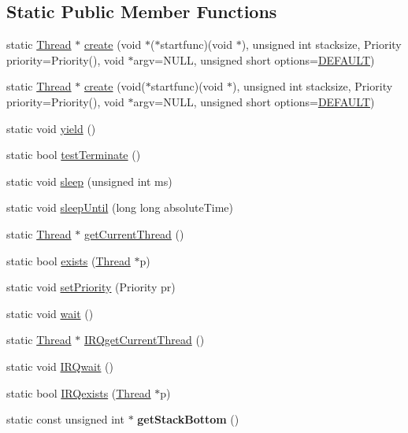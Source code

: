 \subsection*{Static Public Member Functions}
\begin{DoxyCompactItemize}
\item 
static \hyperlink{classmiosix_1_1_thread}{Thread} $\ast$ \hyperlink{classmiosix_1_1_thread_ac5a454f2617a4a28f00842b1097fc363}{create} (void $\ast$($\ast$startfunc)(void $\ast$), unsigned int stacksize, Priority priority=Priority(), void $\ast$argv=N\-U\-L\-L, unsigned short options=\hyperlink{classmiosix_1_1_thread_acaef68f0e93f6ad933442d87c210daafa03df086cf889e215d75222d10486b71e}{D\-E\-F\-A\-U\-L\-T})
\item 
static \hyperlink{classmiosix_1_1_thread}{Thread} $\ast$ \hyperlink{classmiosix_1_1_thread_a12d19634d30226cb4441a77b233a5bf2}{create} (void($\ast$startfunc)(void $\ast$), unsigned int stacksize, Priority priority=Priority(), void $\ast$argv=N\-U\-L\-L, unsigned short options=\hyperlink{classmiosix_1_1_thread_acaef68f0e93f6ad933442d87c210daafa03df086cf889e215d75222d10486b71e}{D\-E\-F\-A\-U\-L\-T})
\item 
static void \hyperlink{classmiosix_1_1_thread_a75823b1288a7defcb715fd6591a23b2d}{yield} ()
\item 
static bool \hyperlink{classmiosix_1_1_thread_a0ef492878827009d2d55442266d13b99}{test\-Terminate} ()
\item 
static void \hyperlink{classmiosix_1_1_thread_ad7f738dc69a918960fe814a062696c5c}{sleep} (unsigned int ms)
\item 
static void \hyperlink{classmiosix_1_1_thread_aac116a322826366c7b3269db3ab4be73}{sleep\-Until} (long long absolute\-Time)
\item 
static \hyperlink{classmiosix_1_1_thread}{Thread} $\ast$ \hyperlink{classmiosix_1_1_thread_a884bfd106afeb274c339d383702b4aec}{get\-Current\-Thread} ()
\item 
static bool \hyperlink{classmiosix_1_1_thread_adb06c8f5761db66d1089a61db71dcf92}{exists} (\hyperlink{classmiosix_1_1_thread}{Thread} $\ast$p)
\item 
static void \hyperlink{classmiosix_1_1_thread_af6c4237506c533c00a0144632685b17d}{set\-Priority} (Priority pr)
\item 
static void \hyperlink{classmiosix_1_1_thread_a435fe4527c1fdfcbebf886cd748a3fd4}{wait} ()
\item 
static \hyperlink{classmiosix_1_1_thread}{Thread} $\ast$ \hyperlink{classmiosix_1_1_thread_ae3918e86d91bbe3062f907004ba7f579}{I\-R\-Qget\-Current\-Thread} ()
\item 
static void \hyperlink{classmiosix_1_1_thread_a6aed14f0f04e69f922aba8f0cf7ac0c6}{I\-R\-Qwait} ()
\item 
static bool \hyperlink{classmiosix_1_1_thread_a572b87e4c6174ad4137f964e40bbe515}{I\-R\-Qexists} (\hyperlink{classmiosix_1_1_thread}{Thread} $\ast$p)
\item 
\hypertarget{classmiosix_1_1_thread_a7c548e88ddd4ee0f555f1332e00d36af}{static const unsigned int $\ast$ {\bfseries get\-Stack\-Bottom} ()}\label{classmiosix_1_1_thread_a7c548e88ddd4ee0f555f1332e00d36af}


\end{DoxyCompactItemize}
